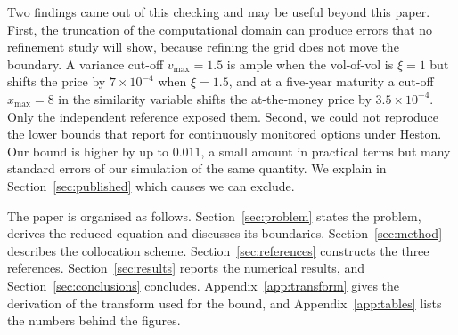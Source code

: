 Two findings came out of this checking and may be useful beyond this paper. First, the truncation of the
computational domain can produce errors that no refinement study will show, because refining the grid does
not move the boundary. A variance cut-off $v_{\max}=1.5$ is ample when the vol-of-vol is $\xi=1$ but
shifts the price by $7\times10^{-4}$ when $\xi=1.5$, and at a five-year maturity a cut-off $x_{\max}=8$
in the similarity variable shifts the at-the-money price by $3.5\times10^{-4}$. Only the independent reference exposed them.
Second, we could not reproduce the lower bounds that \citet{FusaiKyriakou2016} report for continuously
monitored options under Heston. Our bound is higher by up to $0.011$, a small amount in practical terms but
many standard errors of our simulation of the same quantity. We explain in Section~\ref{sec:published}
which causes we can exclude.

The paper is organised as follows. Section~\ref{sec:problem} states the problem, derives the reduced
equation and discusses its boundaries. Section~\ref{sec:method} describes the collocation scheme.
Section~\ref{sec:references} constructs the three references. Section~\ref{sec:results} reports the
numerical results, and Section~\ref{sec:conclusions} concludes. Appendix~\ref{app:transform} gives the
derivation of the transform used for the bound, and Appendix~\ref{app:tables} lists the numbers behind the
figures.
